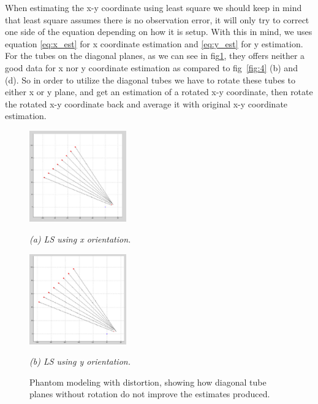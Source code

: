 When estimating the x-y coordinate using least square we should keep in mind that least square assumes
there is no observation error, it will only try to correct one side of the equation depending on how it
is setup. With this in mind, we uses equation \ref{eq:x_est} for x coordinate estimation and \ref{eq:y_est}
for y estimation. For the tubes on the diagonal planes, as we can see in fig\ref{fig:diagonal},
they offers neither a good data for x nor y coordinate estimation as compared to fig~\ref{fig:4} (b) and (d). So in order to utilize the diagonal
tubes we have to rotate these tubes to either x or y plane, and get an estimation of a rotated x-y
coordinate, then rotate the rotated x-y coordinate back and average it with original x-y coordinate
estimation.

\begin{figure}[htb]

  \begin{minipage}[b]{0.48\linewidth}
    \centering
    \centerline{\mbox{\includegraphics[width=1.65in]{isocenter/images/simulation/tube_plane_diagonal_using_x.eps}}}
    \centerline{\emph{(a) LS using x orientation.}}\medskip
  \end{minipage}
  \hfill
  \begin{minipage}[b]{0.48\linewidth}
    \centering
    \centerline{\mbox{\includegraphics[width=1.65in]{isocenter/images/simulation/tube_plane_diagonal_using_y.eps}}}
    \centerline{\emph{(b) LS using y orientation.}}\medskip
  \end{minipage}
  \caption{Phantom modeling with distortion, showing how diagonal tube planes without rotation do not improve the estimates produced.} 
  \label{fig:diagonal}
%
\end{figure}

